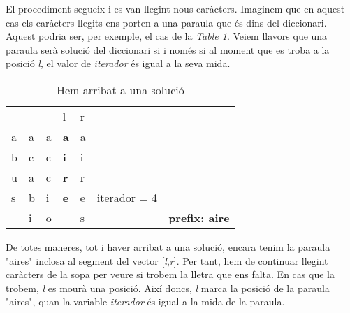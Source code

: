 \documentclass[titlepage]{article}
\begin{document}
El procediment segueix i es van llegint nous caràcters. Imaginem que en aquest cas els caràcters llegits ens porten a una paraula que és dins del diccionari. Aquest podria ser, per exemple, el cas de la \textit{Table \ref{fig:sortedVector3}}. Veiem llavors que una paraula serà solució del diccionari si i només si al moment que es troba a la posició \textit{l}, el valor de \textit{iterador} és igual a la seva mida.  

\begin{table}[H]
\begin{center}

\begin{tabular}{lllllll}
                        &                        &                        & l                      & r                      &          &                        \\ \cline{1-5}
\multicolumn{1}{|l|}{a} & \multicolumn{1}{l|}{a} & \multicolumn{1}{l|}{a} & \multicolumn{1}{l|}{\textbf{a}} & \multicolumn{1}{l|}{a} &          &                        \\
\multicolumn{1}{|l|}{b} & \multicolumn{1}{l|}{c} & \multicolumn{1}{l|}{c} & \multicolumn{1}{l|}{\textbf{i}} & \multicolumn{1}{l|}{i} &          &                        \\
\multicolumn{1}{|l|}{u} & \multicolumn{1}{l|}{a} & \multicolumn{1}{l|}{c} & \multicolumn{1}{l|}{\textbf{r}} & \multicolumn{1}{l|}{r} &          &                        \\
\multicolumn{1}{|l|}{s} & \multicolumn{1}{l|}{b} & \multicolumn{1}{l|}{i} & \multicolumn{1}{l|}{\textbf{e}} & \multicolumn{1}{l|}{e} & iterador = 4 &                        \\ \cline{1-1} \cline{4-4}
\multicolumn{1}{l|}{}   & \multicolumn{1}{l|}{i} & \multicolumn{1}{l|}{o} & \multicolumn{1}{l|}{}  & \multicolumn{1}{l|}{s} &          & \textbf{prefix: aire} \\ \cline{2-3} \cline{5-5}
\end{tabular}
    \caption{Hem arribat a una solució}
            \label{fig:sortedVector3}
\end{center}
\end{table}

De totes maneres, tot i haver arribat a una solució, encara tenim la paraula "aires" inclosa al segment del vector [\textit{l},\textit{r}]. Per tant, hem de continuar llegint caràcters de la sopa per veure si trobem la lletra que ens falta. En cas que la trobem, \textit{l} es mourà una posició. Així doncs, \textit{l} marca la posició de la paraula "aires", quan la variable \textit{iterador} és igual a la mida de la paraula.
\end{document}
